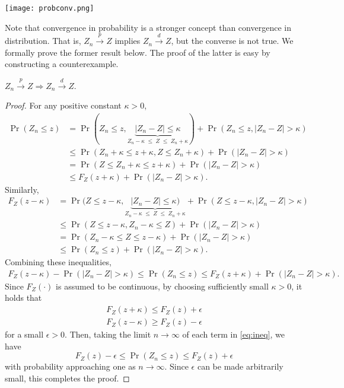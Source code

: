 \documentclass[11pt, A4paper, openany, uplatex]{book}
\begin{document}
\begin{center}
		\texttt{[image: probconv.png]}
\end{center}


Note that convergence in probability is a stronger concept than convergence in distribution.
That is, $Z_n \overset{p}{\to} Z$ implies $Z_n \overset{d}{\to} Z$, but the converse is not true.
We formally prove the former result below.
The proof of the latter is easy by constructing a counterexample.
\begin{lemma}\label{lem:p_to_d}
	$Z_n \overset{p}{\to} Z \Longrightarrow Z_n \overset{d}{\to} Z$.
\end{lemma}

\begin{proof}
	For any positive constant $\kappa > 0$,
	\begin{align*}
	\Pr(Z_n \le z) 
	& = \Pr(Z_n \le z, \underbrace{|Z_n - Z| \le \kappa}_{Z_n - \kappa \; \le \; Z \; \le \; Z_n + \kappa}) + \Pr(Z_n \le z, |Z_n - Z| > \kappa) \\
	& \le \Pr(Z_n + \kappa \le z + \kappa, Z \le Z_n + \kappa) + \Pr(|Z_n - Z| > \kappa) \\
	& = \Pr(Z \le Z_n + \kappa \le z + \kappa) + \Pr(|Z_n - Z| > \kappa) \\
	& \le F_Z(z + \kappa) + \Pr(|Z_n - Z| > \kappa).
	\end{align*}
	Similarly,
	\begin{align*}
	F_Z(z - \kappa)
	& = \Pr(Z \le z - \kappa, \underbrace{|Z_n - Z | \le \kappa)}_{Z_n - \kappa \; \le \; Z \; \le \; Z_n + \kappa} + \Pr(Z \le z - \kappa, |Z_n - Z| > \kappa) \\
	& \le \Pr(Z \le z - \kappa, Z_n - \kappa \le Z) + \Pr(|Z_n - Z| > \kappa) \\
	& = \Pr(Z_n - \kappa \le Z \le z - \kappa) + \Pr(|Z_n - Z| > \kappa) \\
	& \le \Pr(Z_n \le z) + \Pr(|Z_n - Z| > \kappa).
	\end{align*}
	Combining these inequalities,
	\begin{align}\label{eq:ineq}
	F_Z(z - \kappa) - \Pr(|Z_n - Z| > \kappa) \le \Pr(Z_n \le z) \le F_Z(z + \kappa) + \Pr(|Z_n - Z| > \kappa).
	\end{align}
	Since $F_Z(\cdot)$ is assumed to be continuous, by choosing sufficiently small $\kappa > 0$, it holds that 
	\begin{align*}
	F_Z(z + \kappa) \le  F_Z(z) + \epsilon \\
	F_Z(z - \kappa) \ge F_Z(z) - \epsilon
	\end{align*}
	for a small $\epsilon > 0$.
	Then, taking the limit $n \to \infty$ of each term in \eqref{eq:ineq}, we have
	\[
	F_Z(z) - \epsilon \le \Pr(Z_n \le z) \le F_Z(z) + \epsilon
	\]
	with probability approaching one as $n \to \infty$. 
	Since $\epsilon$ can be made arbitrarily small, this completes the proof.
\end{proof}
\bigskip
\end{document}
